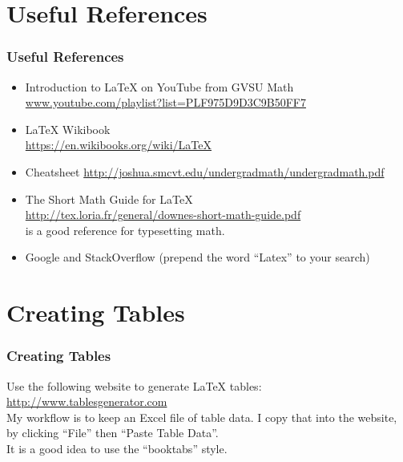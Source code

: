 \documentclass{beamer}
\begin{document}
\section{Useful References}
\begin{frame}
  \frametitle{Useful References}


  \begin{itemize}
    \item
      Introduction to \LaTeX{} on YouTube from GVSU Math\\
      \href{https://www.youtube.com/playlist?list=PLF975D9D3C9B50FF7}{www.youtube.com/playlist?list=PLF975D9D3C9B50FF7}

    \item
      \LaTeX{} Wikibook\\
      \url{https://en.wikibooks.org/wiki/LaTeX}

    \item
      Cheatsheet
      \url{http://joshua.smcvt.edu/undergradmath/undergradmath.pdf}

    \item
      The Short Math Guide for \LaTeX{}\\
      \url{http://tex.loria.fr/general/downes-short-math-guide.pdf}\\
      is a good reference for typesetting math.


      \item
        Google and StackOverflow (prepend the word ``Latex'' to your search)
  \end{itemize}

\end{frame}


\section{Creating Tables}
\begin{frame}
  \frametitle{Creating Tables}

  Use the following website to generate \LaTeX{} tables:
  \url{http://www.tablesgenerator.com}\\

  My workflow is to keep an Excel file of table data. I copy that into the
  website, by clicking ``File'' then ``Paste Table Data''.\\

  It is a good idea to use the ``booktabs'' style.


\end{frame}
\end{document}
